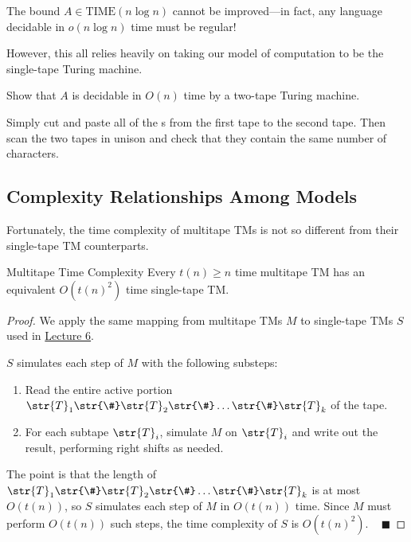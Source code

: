 The bound $A \in \mathrm{TIME}(n \log n)$
cannot be improved---in fact,
any language decidable in $o(n \log n)$ time must be regular!

However, this all relies heavily on
taking our model of computation to be the single-tape Turing machine.

\begin{problem}
    Show that $A$ is decidable in $O(n)$ time
    by a two-tape Turing machine.
\end{problem}

\begin{solution}
    Simply cut and paste all of the s
    from the first tape to the second tape.
    Then scan the two tapes in unison
    and check that they contain the same number of characters.
\end{solution}

\subsection{Complexity Relationships Among Models}

Fortunately, the time complexity of multitape TMs
is not so different from their single-tape TM counterparts.

\begin{theorem}{Multitape Time Complexity}
    Every $t(n) \geq n$ time multitape TM
    has an equivalent $O(t(n)^2)$ time single-tape TM.
\end{theorem}

\begin{proof}
    We apply the same mapping from
    multitape TMs $M$ to single-tape TMs $S$
    used in \href{/18.404/lectures/6/#multi-tape-turing-machines}{Lecture 6}.

    $S$ simulates each step of $M$ with the following substeps:
    \begin{enumerate}
        \item Read the entire active portion
        $\str{T}_1\str{\#}\str{T}_2\str{\#}\dots\str{\#}\str{T}_k$
        of the tape.
        \item For each subtape $\str{T}_i$,
        simulate $M$ on $\str{T}_i$ and
        write out the result, performing right shifts as needed.
    \end{enumerate}
    The point is that the length of
    $\str{T}_1\str{\#}\str{T}_2\str{\#}\dots\str{\#}\str{T}_k$
    is at most $O(t(n))$,
    so $S$ simulates each step of $M$ in $O(t(n))$ time.
    Since $M$ must perform $O(t(n))$ such steps,
    the time complexity of $S$ is $O(t(n)^2)$.
    ~ $\blacksquare$
\end{proof}

